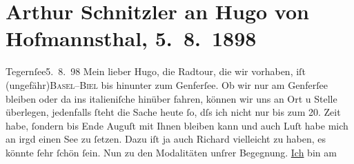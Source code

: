 

         
         \renewcommand{\erwaehntePersonen}{Personen: Richard Beer-Hofmann, Hugo von Hofmannsthal, Gustav Schwarzkopf}
         \renewcommand{\erwaehnteOrte}{Orte: Basel, Biel, Genfer See, Hinterbrühl, Innsbruck, Italien, München, Salzburg, Tegernsee, Wien}
         \renewcommand{\erwaehnteWerke}{Werke: Der Tod Georgs}
               \section[Arthur Schnitzler an Hugo von Hofmannsthal, 5. 8. 1898]{ Arthur Schnitzler an Hugo von Hofmannsthal, 5. 8. 1898}\nopagebreak{}\rehead{ }\begin{ledgroupsized}[t]{13cm}\normalsize\beginnumbering{} \toendnotes[C]{\smallbreak\pagebreak[2]} 
\toendnotes[C]{\smallbreak}\pstart
           \raggedleft{}{\pb}Tegernſee5. 8. 98\pend
           \pstart
           Mein lieber Hugo, die Radtour, die wir vorhaben, iſt \introOben{}(\introOben{}ungefähr\introOben{})\introOben{}{ }\textsc{Basel}–\textsc{Biel} bis hinunter zum Genferſee. Ob wir nur am
                  Genferſee bleiben oder da{\geminationn} ins italieniſche
               hinüber fahren, können wir uns an Ort u Stelle überlegen, jedenfalls ſteht die Sache
               heute ſo, dſs ich nicht nur bis zum 20. Zeit habe, ſondern bis
                  Ende Auguſt mit Ihnen bleiben kann und auch Luſt habe {\pb}mich an irgd einen See zu ſetzen. Dazu iſt ja auch Richard vielleicht zu haben, es könnte ſehr
               ſchön ſein.\pend
           \pstart
           Nun zu den Modalitäten unſrer Begegnung. \uline{Ich} bin am

\end{ledgroupsized}
